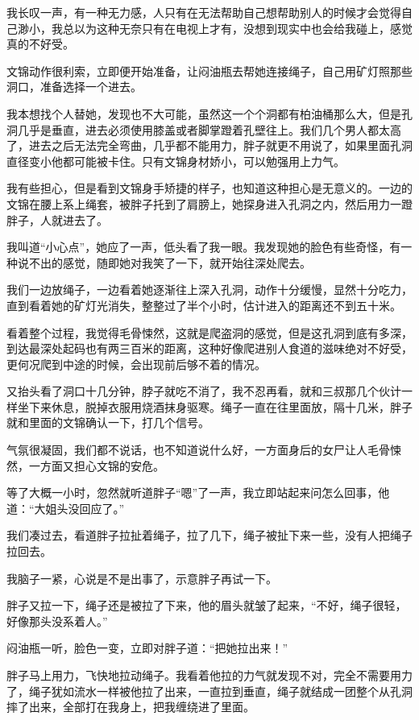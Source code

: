 我长叹一声，有一种无力感，人只有在无法帮助自己想帮助别人的时候才会觉得自己渺小，我总以为这种无奈只有在电视上才有，没想到现实中也会给我碰上，感觉真的不好受。

文锦动作很利索，立即便开始准备，让闷油瓶去帮她连接绳子，自己用矿灯照那些洞口，准备选择一个进去。

我本想找个人替她，发现也不大可能，虽然这一个个洞都有柏油桶那么大，但是孔洞几乎是垂直，进去必须使用膝盖或者脚掌蹬着孔壁往上。我们几个男人都太高了，进去之后无法完全弯曲，几乎都不能用力，胖子就更不用说了，如果里面孔洞直径变小他都可能被卡住。只有文锦身材娇小，可以勉强用上力气。

我有些担心，但是看到文锦身手矫捷的样子，也知道这种担心是无意义的。一边的文锦在腰上系上绳套，被胖子托到了肩膀上，她探身进入孔洞之内，然后用力一蹬胖子，人就进去了。

我叫道“小心点”，她应了一声，低头看了我一眼。我发现她的脸色有些奇怪，有一种说不出的感觉，随即她对我笑了一下，就开始往深处爬去。

我们一边放绳子，一边看着她逐渐往上深入孔洞，动作十分缓慢，显然十分吃力，直到看着她的矿灯光消失，整整过了半个小时，估计进入的距离还不到五十米。

看着整个过程，我觉得毛骨悚然，这就是爬盗洞的感觉，但是这孔洞到底有多深，到达最深处起码也有两三百米的距离，这种好像爬进别人食道的滋味绝对不好受，更何况爬到中途的时候，会出现前后够不着的情况。

又抬头看了洞口十几分钟，脖子就吃不消了，我不忍再看，就和三叔那几个伙计一样坐下来休息，脱掉衣服用烧酒抹身驱寒。绳子一直在往里面放，隔十几米，胖子就和里面的文锦确认一下，打几个信号。

气氛很凝固，我们都不说话，也不知道说什么好，一方面身后的女尸让人毛骨悚然，一方面又担心文锦的安危。

等了大概一小时，忽然就听道胖子“嗯”了一声，我立即站起来问怎么回事，他道：“大姐头没回应了。”

我们凑过去，看道胖子拉扯着绳子，拉了几下，绳子被扯下来一些，没有人把绳子拉回去。

我脑子一紧，心说是不是出事了，示意胖子再试一下。

胖子又拉一下，绳子还是被拉了下来，他的眉头就皱了起来，“不好，绳子很轻，好像那头没系着人。”

闷油瓶一听，脸色一变，立即对胖子道：“把她拉出来！”

胖子马上用力，飞快地拉动绳子。我看着他拉的力气就发现不对，完全不需要用力了，绳子犹如流水一样被他拉了出来，一直拉到垂直，绳子就结成一团整个从孔洞摔了出来，全部打在我身上，把我缠绕进了里面。


